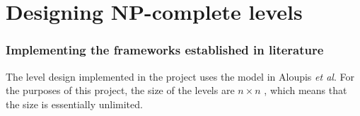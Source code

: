 \documentclass[11pt, a4paper, oneside]{report} %
\begin{document}




\section{Designing NP-complete levels}


\subsubsection{Implementing the frameworks established in literature}

The level design implemented in the project uses the model in Aloupis \textit{et
al}. For the purposes of this project, the size of the levels are $n\times n$ ,
which means that the size is essentially unlimited.





\end{document}
